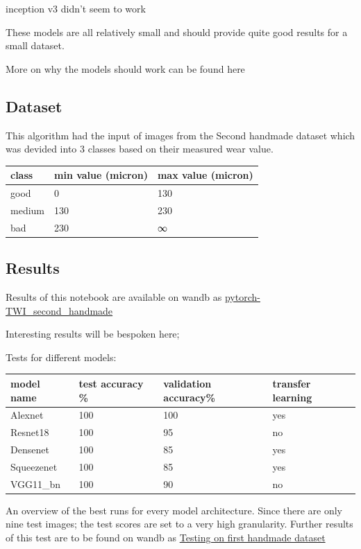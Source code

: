 \documentclass{article}
\begin{document}
inception v3 didn't seem to work



These models are all relatively small and should provide quite good results for a small dataset. 

More on why the models should work can be found here



\subsection{Dataset}



This algorithm had the input of images from the Second handmade dataset which was devided into 3 classes based on their measured wear value. 

\begin{tabular}{ |l|l|l| }
\hline
 class & min value (micron) & max value (micron) \tabularnewline
\hline
\hline
 good & 0 & 130 \tabularnewline
\hline
 medium & 130 & 230 \tabularnewline
\hline
 bad & 230 & ∞ \tabularnewline
\hline
\end{tabular}










\subsection{Results}

Results of this notebook are available on wandb as \href{https://wandb.ai/dplars/pytorch-TWI_second_handmade?workspace=user-dplars}{pytorch-TWI\_second\_handmade}



Interesting results will be bespoken here;

Tests for different models: 

\begin{tabular}{ |l|l|l|l| }
\hline
 model name & test accuracy \% & validation accuracy\% & transfer learning \tabularnewline
\hline
\hline
 Alexnet & 100 & 100 & yes \tabularnewline
\hline
 Resnet18 & 100 & 95 & no \tabularnewline
\hline
 Densenet & 100 & 85 & yes \tabularnewline
\hline
 Squeezenet & 100 & 85 & yes \tabularnewline
\hline
 VGG11\_bn & 100 & 90 & no \tabularnewline
\hline
\end{tabular}
										

An overview of the best runs for every model architecture. Since there are only nine test images; the test scores are set to a very high granularity. Further results of this test are to be found on wandb as \href{https://wandb.ai/dplars/pytorch-TWI_second_handmade/reports/Testing-on-first-handmade-dataset--VmlldzozNTE5NzM}{Testing on first handmade dataset}
\end{document}
